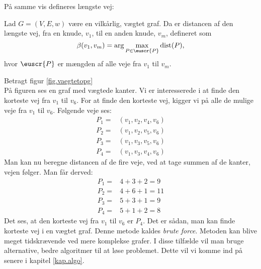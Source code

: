På samme vis defineres længste vej:

\begin{defn} 
	Lad $G=(V,E,w)$ være en vilkårlig, vægtet graf. Da er distancen af den længste vej, fra en knude, $v_1$, til en anden knude, $v_m$, defineret som
	\begin{equation*}
		\beta(v_1,v_m)=\arg \max_{P \in \euscr{P}}
		\textrm{dist}(P),
	\end{equation*}
	hvor $\euscr{P}$ er mængden af alle veje fra $v_1$ til $v_m$.
\end{defn}

\begin{exmp}
Betragt figur \ref{fig.vaegtetopg} \\

På figuren ses en graf med vægtede kanter. Vi er interesserede i at finde den korteste vej fra $v_1$ til $v_6$. For at finde den korteste vej, kigger vi på alle de mulige veje fra $v_1$ til $v_6$.
Følgende veje ses:
\begin{align*}
	P_1=&(v_1,v_2,v_4,v_6)\\
	P_2=&(v_1,v_2,v_5,v_6)\\
	P_3=&(v_1,v_3,v_5,v_6)\\
	P_4=&(v_1,v_3,v_4,v_6)
\end{align*}
Man kan nu beregne distancen af de fire veje, ved at tage summen af de kanter, vejen følger. Man får derved:
\begin{align*}
	P_1=&4+3+2=9\\
	P_2=&4+6+1=11\\
	P_3=&5+3+1=9\\
	P_4=&5+1+2=8
\end{align*}
Det ses, at den korteste vej fra $v_1$ til $v_6$ er $P_4$. 
Det er sådan, man kan finde korteste vej i en vægtet graf. Denne metode kaldes \emph{brute force}. Metoden kan blive meget tidskrævende ved mere komplekse grafer. I disse tilfælde vil man bruge alternative, bedre algoritmer til at løse problemet. Dette vil vi komme ind på senere i kapitel \ref{kap.algo}.
\end{exmp}
